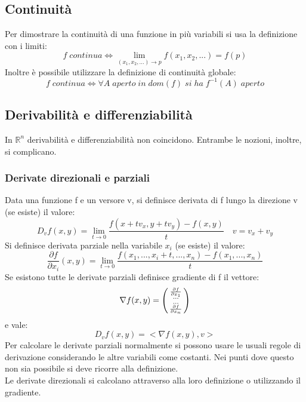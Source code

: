 \documentclass{article}
\newcommand{\R}{\mathds{R}}
\begin{document}
\subsection{Continuità}
Per dimostrare la continuità di una funzione in più variabili si usa la definizione con i limiti:
$$ f\;continua\Leftrightarrow \lim_{(x_1,x_2,...)\rightarrow p}f(x_1,x_2,...)=f(p) $$
Inoltre è possibile utilizzare la definizione di continuità globale:
$$f\; continua\Leftrightarrow\forall A\; aperto\; in\; dom(f)\; si\; ha\; f^{-1}(A)\; aperto $$

\subsection{Derivabilità e differenziabilità}
In $\R^n$ derivabilità e differenziabilità non coincidono. Entrambe le nozioni, inoltre, si complicano.

\subsubsection{Derivate direzionali e parziali}
Data una funzione f e un versore v, si definisce derivata di f lungo la direzione v (se esiste) il valore:
$$ D_vf(x,y)=\lim_{t\rightarrow0} \frac{f(x+tv_x,y+tv_y)-f(x,y)}{t}\quad v=v_x+v_y$$
Si definisce derivata parziale nella variabile $x_i$ (se esiste) il valore:
$$ \frac{\partial f}{\partial x_i}(x,y)= \lim_{t\rightarrow0}\frac{f(x_1,...,x_i+t,...,x_n)-f(x_1,...,x_n)}{t} $$
Se esistono tutte le derivate parziali definisce gradiente di f il vettore:
$$\nabla f(x,y) = \begin{psmallmatrix} \frac{\partial f}{\partial x_1}\\...\\...\\ \frac{\partial f}{\partial x_n}  \end{psmallmatrix}$$
e vale:
$$ D_vf(x,y)=<\nabla f(x,y), v> $$
Per calcolare le derivate parziali normalmente si possono usare le usuali regole di derivazione considerando le altre variabili come costanti. Nei punti dove questo non sia possibile si deve ricorre alla definizione.\\
Le derivate direzionali si calcolano attraverso alla loro definizione o utilizzando il gradiente.
\end{document}
